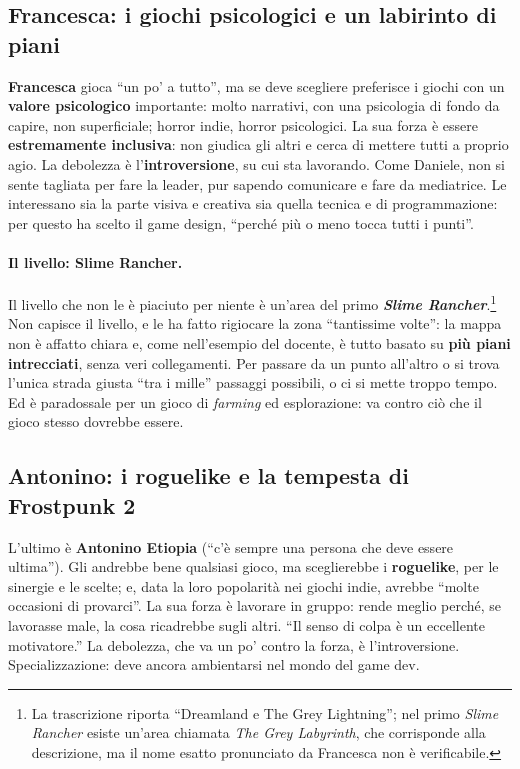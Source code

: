 \subsection{Francesca: i giochi psicologici e un labirinto di piani}

\textbf{Francesca} gioca ``un po' a tutto'', ma se deve scegliere preferisce
i giochi con un \textbf{valore psicologico} importante: molto narrativi, con
una psicologia di fondo da capire, non superficiale; horror indie, horror
psicologici. La sua forza è essere \textbf{estremamente inclusiva}: non giudica
gli altri e cerca di mettere tutti a proprio agio. La debolezza è
l'\textbf{introversione}, su cui sta lavorando. Come Daniele, non si sente
tagliata per fare la leader, pur sapendo comunicare e fare da mediatrice. Le
interessano sia la parte visiva e creativa sia quella tecnica e di
programmazione: per questo ha scelto il game design, ``perché più o meno
tocca tutti i punti''.

\paragraph{Il livello: Slime Rancher.} Il livello che non le è piaciuto per
niente è un'area del primo \textbf{\emph{Slime Rancher}}.\footnote{La
trascrizione riporta ``Dreamland e The Grey Lightning''; nel primo
\emph{Slime Rancher} esiste un'area chiamata \emph{The Grey Labyrinth}, che
corrisponde alla descrizione, ma il nome esatto pronunciato da Francesca non è
verificabile.} Non capisce il livello, e le ha fatto rigiocare la zona
``tantissime volte'': la mappa non è affatto chiara e, come nell'esempio del
docente, è tutto basato su \textbf{più piani intrecciati}, senza veri
collegamenti. Per passare da un punto all'altro o si trova l'unica strada
giusta ``tra i mille'' passaggi possibili, o ci si mette troppo tempo. Ed è
paradossale per un gioco di \emph{farming} ed esplorazione: va contro ciò che
il gioco stesso dovrebbe essere.

\subsection{Antonino: i roguelike e la tempesta di Frostpunk 2}

L'ultimo è \textbf{Antonino Etiopia} (``c'è sempre una persona che deve
essere ultima''). Gli andrebbe bene qualsiasi gioco, ma sceglierebbe i
\textbf{roguelike}, per le sinergie e le scelte; e, data la loro popolarità
nei giochi indie, avrebbe ``molte occasioni di provarci''. La sua forza è
lavorare in gruppo: rende meglio perché, se lavorasse male, la cosa ricadrebbe
sugli altri. ``Il senso di colpa è un eccellente motivatore.'' La debolezza,
che va un po' contro la forza, è l'introversione. Specializzazione: deve
ancora ambientarsi nel mondo del game dev.

